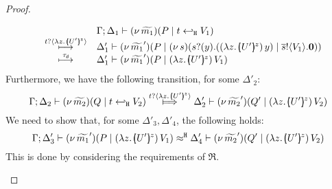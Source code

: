 \begin{proof}
\begin{enumerate}[$-$]
\begin{enumerate}[(a)]
\begin{enumerate}[i)]

							\[
							\begin{array}{rcl}
							& & \Gamma; \Delta_1 \proves \newsp{\widetilde{m_1}}{P \Par \htrigger{t}{V_1}  } \\
							&  \hby{\bactinp{t}{\abs{z}{\mapchar{U'}{z}}}} & 
							\Delta_1' \proves \newsp{\widetilde{m_1}'}{P \Par \newsp{s}{\binp{s}{y} {(\appl{(\abs{z}{\mapchar{U'}{z}})}{y}}) \Par \bout{\dual{s}}{V_1} \inact}}
							\\
							& \hby{\dtau} & \Delta_1' \proves \newsp{\widetilde{m_1}'}{P \Par \appl{(\abs{z}{\mapchar{U'}{z}})}{V_1}}
								\end{array}
							\]
							Furthermore, we have the following transition, for some $\Delta'_2$:
							\[
								\horel{\Gamma}{\Delta_2}{\newsp{\widetilde{m_2}}{Q \Par \htrigger{t}{V_2}  } }
								{\Hby{\bactinp{t}{\abs{z}{\mapchar{U'}{z}}}}}
								{\Delta_2'}{\newsp{\widetilde{m_2}'}{Q' \Par \appl{(\abs{z}{\mapchar{U'}{z}})}{V_2}}}
							\]
							We need to show that, for some $\Delta'_3, \Delta'_4$, the following holds:
							\[
								\horel{\Gamma}{\Delta_3'}{\newsp{\widetilde{m_1}'}{P \Par \appl{(\abs{z}{\mapchar{U'}{z}})}{V_1}}}
								{\hwb}
								{\Delta_4'}{\newsp{\widetilde{m_2}'}{Q' \Par \appl{(\abs{z}{\mapchar{U'}{z}})}{V_2}}}
							\]
							This is done by considering the requirements of $\Re$.


\end{enumerate}
\end{enumerate}
\end{enumerate}
\end{proof}
